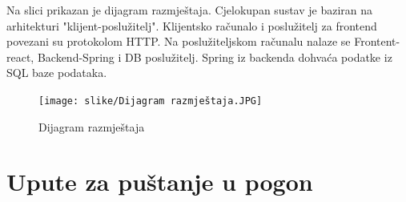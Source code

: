 		{Na slici prikazan je dijagram razmještaja. Cjelokupan sustav je baziran na arhitekturi "klijent-poslužitelj". Klijentsko računalo i poslužitelj za frontend povezani su protokolom HTTP. Na poslužiteljskom računalu nalaze se Frontent-react, Backend-Spring i DB poslužitelj. Spring iz backenda dohvaća podatke iz SQL baze podataka.}
			
		\begin{figure}[H]
			\texttt{[image: slike/Dijagram razmještaja.JPG]}
			\centering
			\caption{Dijagram razmještaja}
			\label{fig:Dijagram razmještaja}
		\end{figure}
		\eject 
		
		\section{Upute za puštanje u pogon}
		
		
